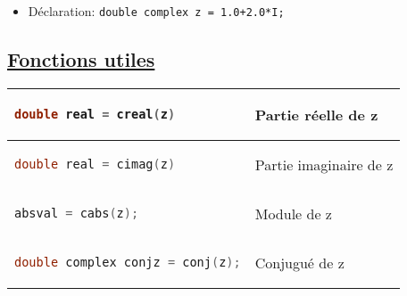 \documentclass[a3paper,12pt]{article}
\begin{document}
\begin{minipage}[t]{0.5\textwidth}
\begin{tcolorbox}[title=Nombres complexes, fonttitle=\large, top=0pt, bottom=5pt, boxsep=1pt, colback=white,
  colframe=turquoise, 
  colbacktitle=turquoise,
  coltitle=white,]
\begin{itemize}
\item Déclaration: \lstinline|double complex z = 1.0+2.0*I;|

\end{itemize}

\vspace{-1.1em}
\subsection*{{\small \underline{Fonctions utiles}}}

\begin{tabular}{|l|l|}
\hline
\begin{minipage}[t]{7.5cm}
\vspace{-\baselineskip}
\begin{lstlisting}[language=C, basicstyle=\normalsize , aboveskip=5pt, belowskip=5pt]
double real = creal(z)
\end{lstlisting}
\vspace{-\baselineskip}
\end{minipage}
& Partie réelle de z\\
\hline
\begin{minipage}[t]{6.5cm}
\vspace{-\baselineskip}
\begin{lstlisting}[language=C, basicstyle=\normalsize , aboveskip=5pt, belowskip=5pt]
double real = cimag(z)
\end{lstlisting}
\vspace{-\baselineskip}
\end{minipage}
& Partie imaginaire de z\\
\hline
\begin{minipage}[t]{6.5cm}
\vspace{-\baselineskip}
\begin{lstlisting}[language=C, basicstyle=\normalsize , aboveskip=5pt, belowskip=5pt]
absval = cabs(z);
\end{lstlisting}
\vspace{-\baselineskip}
\end{minipage}
& Module de z\\
\hline
\begin{minipage}[t]{6.5cm}
\vspace{-\baselineskip}
\begin{lstlisting}[language=C, basicstyle=\normalsize , aboveskip=5pt, belowskip=5pt]
double complex conjz = conj(z);
\end{lstlisting}
\vspace{-\baselineskip}
\end{minipage}
& Conjugué de z\\
\hline
\end{tabular}
\vspace{0.05em}
\end{tcolorbox}



\end{minipage}
\end{document}
